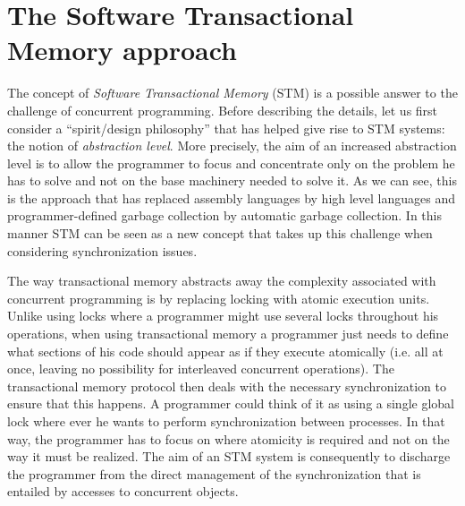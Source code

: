 
\section{The Software Transactional Memory approach}
The concept of {\it Software Transactional  Memory}   (STM)  is  a possible answer  
to   the  challenge of concurrent programming.
Before describing the details, let us first consider a ``spirit/design philosophy'' that has helped give
rise to  STM systems: the notion of 
{\it abstraction level}.
More precisely,  the  aim of an increased abstraction level is   to allow  the programmer  to  focus and
concentrate only  on the problem  he has to
solve and not on the base machinery needed to solve it. 
As we can see, this is the approach  that  has   replaced assembly languages  
by  high level languages and programmer-defined garbage collection 
by automatic garbage collection.
In this manner STM can  be seen as a  new concept
that takes  up  this challenge when considering synchronization issues.

The way transactional memory abstracts away the  complexity associated with 
concurrent programming is   by  replacing locking  with  atomic
execution units.
Unlike using locks where a programmer might use several locks
throughout his operations, when using transactional memory
a programmer just needs to define what sections of his code should
appear as if they execute atomically (i.e. all at once, leaving
no possibility for interleaved concurrent operations).
The transactional memory protocol then deals with the necessary
synchronization to ensure that this happens.
A programmer could think of it as using a single global lock
where ever he wants to perform synchronization between processes.
In  that way, the programmer has to focus on  where 
atomicity is required and  not on the  way it must be realized. The aim of
an STM system is consequently  to  discharge the programmer from the direct 
management  of  the  synchronization  that  is entailed  by   accesses   to
concurrent  objects.  

